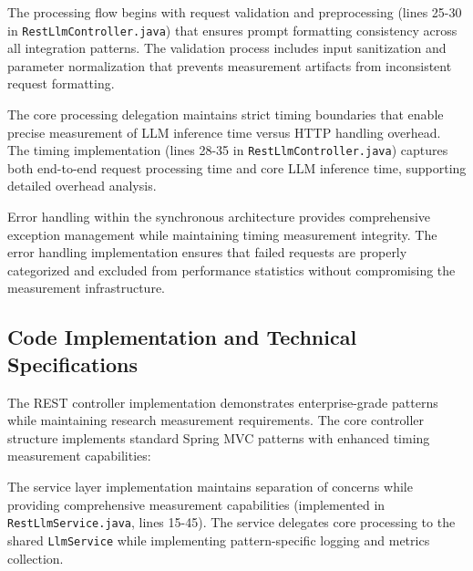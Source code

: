 The processing flow begins with request validation and preprocessing (lines 25-30 in \texttt{RestLlmController.java}) that ensures prompt formatting consistency across all integration patterns. The validation process includes input sanitization and parameter normalization that prevents measurement artifacts from inconsistent request formatting.


The core processing delegation maintains strict timing boundaries that enable precise measurement of LLM inference time versus HTTP handling overhead. The timing implementation (lines 28-35 in \texttt{RestLlmController.java}) captures both end-to-end request processing time and core LLM inference time, supporting detailed overhead analysis.


Error handling within the synchronous architecture provides comprehensive exception management while maintaining timing measurement integrity. The error handling implementation ensures that failed requests are properly categorized and excluded from performance statistics without compromising the measurement infrastructure.

\subsection{Code Implementation and Technical Specifications}



The REST controller implementation demonstrates enterprise-grade patterns while maintaining research measurement requirements. The core controller structure implements standard Spring MVC patterns with enhanced timing measurement capabilities:




The service layer implementation maintains separation of concerns while providing comprehensive measurement capabilities (implemented in \texttt{RestLlmService.java}, lines 15-45). The service delegates core processing to the shared \texttt{LlmService} while implementing pattern-specific logging and metrics collection.


